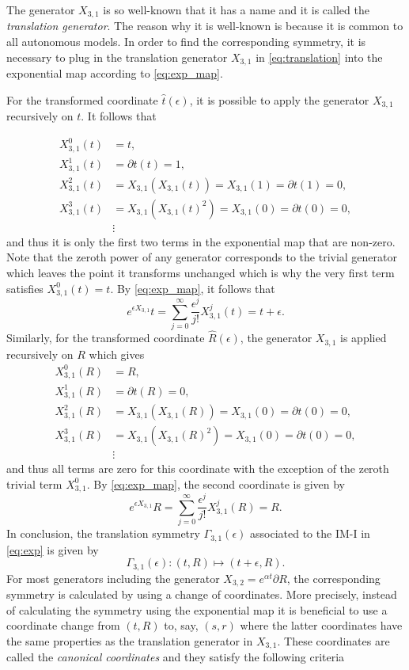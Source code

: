 The generator $X_{3,1}$ is so well-known that it has a name and it is called the \textit{translation generator}. The reason why it is well-known is because it is common to all autonomous models. In order to find the corresponding symmetry, it is necessary to plug in the translation generator $X_{3,1}$ in \eqref{eq:translation} into the exponential map according to \eqref{eq:exp_map}.

For the transformed coordinate $\hat{t}(\epsilon)$, it is possible to apply the generator $X_{3,1}$ recursively on $t$. It follows that

\begin{align*}
X^{0}_{3,1}(t)&=t,\\  
X^{1}_{3,1}(t)&=\partial t(t)=1,\\
X^{2}_{3,1}(t)&=X_{3,1}(X_{3,1}(t))=X_{3,1}(1)=\partial t(1)=0,\\
X^{3}_{3,1}(t)&=X_{3,1}(X_{3,1}(t)^2)=X_{3,1}(0)=\partial t(0)=0,\\
&\vdots
\end{align*}
and thus it is only the first two terms in the exponential map that are non-zero. Note that the zeroth power of any generator corresponds to the trivial generator which leaves the point it transforms unchanged which is why the very first term satisfies $X^{0}_{3,1}(t)=t$. By \eqref{eq:exp_map}, it follows that
$$e^{\epsilon X_{3,1}}t=\sum_{j=0}^{\infty}\frac{\epsilon^j}{j!}X_{3,1}^j(t)=t+\epsilon.$$
Similarly, for the transformed coordinate $\hat{R}(\epsilon)$, the generator $X_{3,1}$ is applied recursively on $R$ which gives 
\begin{align*}
X^{0}_{3,1}(R)&=R,\\  
X^{1}_{3,1}(R)&=\partial t(R)=0,\\
X^{2}_{3,1}(R)&=X_{3,1}(X_{3,1}(R))=X_{3,1}(0)=\partial t(0)=0,\\
X^{3}_{3,1}(R)&=X_{3,1}(X_{3,1}(R)^2)=X_{3,1}(0)=\partial t(0)=0,\\
&\vdots
\end{align*}
and thus all terms are zero for this coordinate with the exception of the zeroth trivial term $X^{0}_{3,1}$. By \eqref{eq:exp_map}, the second coordinate is given by
$$e^{\epsilon X_{3,1}}R=\sum_{j=0}^{\infty}\frac{\epsilon^j}{j!}X_{3,1}^j(R)=R.$$
In conclusion, the translation symmetry $\Gamma_{3,1}(\epsilon)$ associated to the IM-I in \eqref{eq:exp} is given by
$$\Gamma_{3,1}(\epsilon):(t,R)\mapsto(t+\epsilon,R).$$
For most generators including the generator $X_{3,2}=e^{\alpha t}\partial R$, the corresponding symmetry is calculated by using a change of coordinates. More precisely, instead of calculating the symmetry using the exponential map it is beneficial to use a coordinate change from $(t,R)$ to, say, $(s,r)$ where the latter coordinates have the same properties as the translation generator in $X_{3,1}$. These coordinates are called the \textit{canonical coordinates} \cite{hydon2000symmetry} and they satisfy the following criteria
